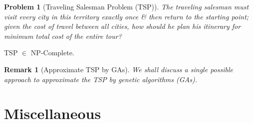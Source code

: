 \documentclass{article}
\newtheorem{problem}{Problem}
\newtheorem{remark}{Remark}
\begin{document}
\begin{problem}[Traveling Salesman Problem (TSP)]
	The traveling salesman must visit every city in this territory exactly once \& then return to the starting point; given the cost of travel between all cities, how should he plan his itinerary for minimum total cost of the entire tour?
\end{problem}
TSP $\in$ NP-Complete.

\begin{remark}[Approximate TSP by GAs]
	We shall discuss a single possible approach to approximate the TSP by genetic algorithms (GAs).
\end{remark}


\section{Miscellaneous}


\printbibliography[heading=bibintoc]
	
\end{document}
